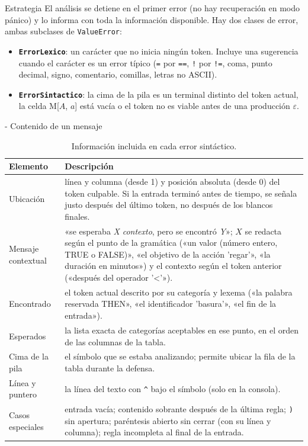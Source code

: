 \documentclass[11pt,letterpaper]{article}
\makeatletter
\renewcommand\subsection{\@startsection{subsection}{2}{\z@}{-2.6ex\@plus -1ex \@minus -.2ex}{1.0ex \@plus .2ex}%
  {\normalfont\large\bfseries}}
\newcommand{\necesita}[1]{\par\penalty-100\begingroup\setlength{\dimen@}{#1}%
  \dimen@ii\pagegoal\advance\dimen@ii-\pagetotal
  \ifdim\dimen@>\dimen@ii\ifdim\dimen@ii>\z@\vfil\fi\break\fi\endgroup}
\newcommand{\T}[1]{\texttt{#1}}
\newcommand{\eps}{\ensuremath{\varepsilon}}
\newcommand{\cabeza}{\rowcolor{cabecera}}
\makeatother
\begin{document}
\subsection{Estrategia}
El análisis se detiene en el primer error (no hay recuperación en modo pánico) y lo informa con toda la
información disponible. Hay dos clases de error, ambas subclases de \T{ValueError}:
\begin{itemize}
\item \textbf{\T{ErrorLexico}}: un carácter que no inicia ningún token. Incluye una sugerencia cuando el carácter es un
error típico (\T{=} por \T{==}, \T{!} por \T{!=}, coma, punto decimal, signo, comentario, comillas, letras no ASCII).
\item \textbf{\T{ErrorSintactico}}: la cima de la pila es un terminal distinto del token actual, la celda M[$A$, $a$]
está vacía o el token no es viable antes de una producción \eps.
\end{itemize}

\necesita{9\baselineskip}
\subsection{Contenido de un mensaje}
\begin{longtable}{>{\raggedright}p{3.8cm}p{12.0cm}}
\caption{Información incluida en cada error sintáctico.}\\
\hline\cabeza \textbf{Elemento} & \textbf{Descripción}\\\hline\endfirsthead
Ubicación & línea y columna (desde 1) y posición absoluta (desde 0) del token culpable. Si la entrada terminó antes de
tiempo, se señala justo después del último token, no después de los blancos finales.\\
Mensaje contextual & «se esperaba \textit{X} \textit{contexto}, pero se encontró \textit{Y}»; $X$ se redacta según el
punto de la gramática («un valor (número entero, TRUE o FALSE)», «el objetivo de la acción 'regar'», «la duración en
minutos») y el contexto según el token anterior («después del operador '<'»).\\
Encontrado & el token actual descrito por su categoría y lexema («la palabra reservada THEN», «el identificador
'basura'», «el fin de la entrada»).\\
Esperados & la lista exacta de categorías aceptables en ese punto, en el orden de las columnas de la tabla.\\
Cima de la pila & el símbolo que se estaba analizando; permite ubicar la fila de la tabla durante la defensa.\\
Línea y puntero & la línea del texto con \T{\textasciicircum} bajo el símbolo (solo en la consola).\\
Casos especiales & entrada vacía; contenido sobrante después de la última regla; \T{)} sin apertura; paréntesis
abierto sin cerrar (con su línea y columna); regla incompleta al final de la entrada.\\\hline
\end{longtable}
\end{document}
